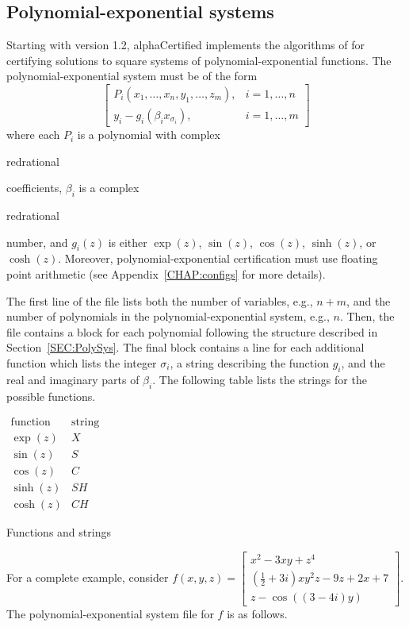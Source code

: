 \documentclass[11pt]{report}
\begin{document}
\subsection{Polynomial-exponential systems}\label{SEC:PolyExpSys}

Starting with version 1.2, alphaCertified implements the algorithms
of \cite{HL11} for certifying solutions to square systems of polynomial-exponential
functions.  The polynomial-exponential system must be of the form
\[
\left[\begin{array}{cc}
P_i(x_1,\dots,x_n,y_1,\dots,z_m), & i = 1,\dots,n \\
y_i - g_i(\beta_i x_{\sigma_i}), & i = 1,\dots,m
\end{array}\right]
\]
where each $P_i$ is a polynomial with complex \begin{color}{red}rational\end{color} coefficients,
$\beta_i$ is a complex \begin{color}{red}rational\end{color} number, and
$g_i(z)$ is either $\exp(z)$, $\sin(z)$, $\cos(z)$, $\sinh(z)$, or $\cosh(z)$.
Moreover, polynomial-exponential certification must use 
floating point arithmetic (see Appendix~\ref{CHAP:configs} for more details).  

The first line of the file lists both the number of variables, e.g., $n + m$,
and the number of polynomials in the polynomial-exponential system, e.g., $n$.  
Then, the file contains a block for each polynomial 
following the structure described in Section~\ref{SEC:PolySys}.  
The final block contains a line for each additional function which lists
the integer $\sigma_i$, a string describing the function $g_i$, and the
real and imaginary parts of $\beta_i$.  The following table lists the
strings for the possible functions.

\begin{table}[h!]
\centering
$\begin{array}{c|c}
\mbox{function} & \mbox{string} \\ 
\hline
\exp(z) & X \\
\sin(z) & S \\
\cos(z) & C \\
\sinh(z) & SH \\
\cosh(z) & CH
\end{array}$
\caption{Functions and strings}\label{Tab:Strings}
\end{table}

For a complete example, consider $f(x,y,z) = \left[\begin{array}{c} x^2 - 3xy + z^4 \\
\left(\frac{1}{2} + 3i\right) xy^2z - 9 z + 2x + 7\\ z - \cos((3 - 4i)y) \end{array}\right]$.
The polynomial-exponential system file for $f$ is as follows.
\end{document}
